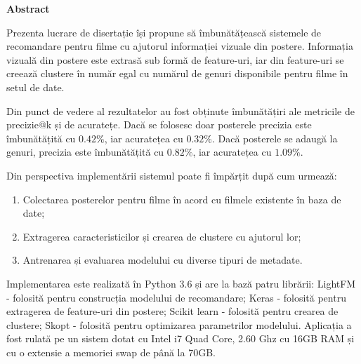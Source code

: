 \thispagestyle{plain}

\begin{center}
	\Large \textbf{Abstract}	
\end{center}

Prezenta lucrare de disertație își propune să îmbunătățească sistemele de recomandare pentru filme cu ajutorul informației vizuale din postere. Informația vizuală din postere este extrasă sub formă de feature-uri, iar din feature-uri se creează clustere în număr egal cu numărul de genuri disponibile pentru filme în setul de date.

\vspace{5mm}
Din punct de vedere al rezultatelor au fost obținute îmbunătățiri ale metricile de precizie@k și de acuratețe. Dacă se folosesc doar posterele precizia este îmbunătățită cu $0.42\%$, iar acuratețea cu $0.32\%$. Dacă posterele se adaugă la genuri, precizia este îmbunătățită cu $0.82\%$, iar acuratețea cu $1.09\%$.

\vspace{5mm}
Din perspectiva implementării sistemul poate fi împărțit după cum urmează:
\begin{enumerate}
	\item Colectarea posterelor pentru filme în acord cu filmele existente în baza de date;
	\item Extragerea caracteristicilor și crearea de clustere cu ajutorul lor; 
	\item Antrenarea și evaluarea modelului cu diverse tipuri de metadate.
\end{enumerate}
Implementarea este realizată în Python 3.6 și are la bază patru librării: LightFM - folosită pentru construcția modelului de recomandare; Keras - folosită pentru extragerea de feature-uri din postere; Scikit learn - folosită pentru crearea de clustere; Skopt - folosită pentru optimizarea parametrilor modelului. Aplicația a fost rulată pe un sistem dotat cu Intel i7 Quad Core, 2.60 Ghz cu 16GB RAM și cu o extensie a memoriei swap de până la 70GB.
\vspace*{\fill}
